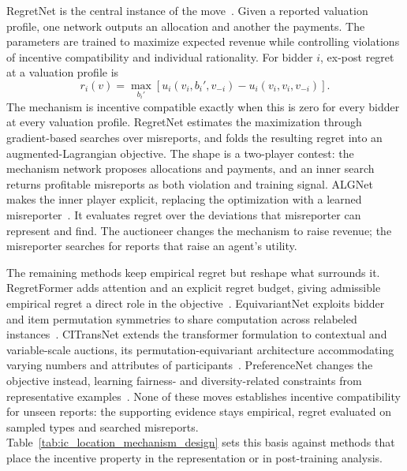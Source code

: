  RegretNet is the central instance of the
move~\citep{Duetting2019}. Given a reported valuation profile, one network outputs
an allocation and another the payments. The parameters are trained to maximize
expected revenue while controlling violations of incentive compatibility and
individual rationality. For bidder \(i\), ex-post regret at a valuation profile is
\[
r_i(v)
=
\max_{b_i'}
\left[
u_i(v_i,b_i',v_{-i})
-
u_i(v_i,v_i,v_{-i})
\right].
\]
The mechanism is incentive compatible exactly when this is zero for every bidder at
every valuation profile. RegretNet estimates the maximization through gradient-based
searches over misreports, and folds the resulting regret into an augmented-Lagrangian
objective. The shape is a two-player contest: the mechanism network proposes
allocations and payments, and an inner search returns profitable misreports as both
violation and training signal. ALGNet makes the inner player explicit, replacing the
optimization with a learned misreporter~\citep{Rahme2021Auction}. It evaluates regret
over the deviations that misreporter can represent and find. The auctioneer changes
the mechanism to raise revenue; the misreporter searches for reports that raise an
agent's utility.

 The remaining methods keep empirical
regret but reshape what surrounds it. RegretFormer adds attention and an explicit
regret budget, giving admissible empirical regret a direct role in the
objective~\citep{Ivanov2022}. EquivariantNet exploits bidder and item permutation
symmetries to share computation across relabeled
instances~\citep{Rahme2021Equivariant}. CITransNet extends the transformer
formulation to contextual and variable-scale auctions, its permutation-equivariant
architecture accommodating varying numbers and attributes of
participants~\citep{Duan2022}. PreferenceNet changes the objective instead, learning
fairness- and diversity-related constraints from representative
examples~\citep{Peri2021}. None of these moves establishes incentive compatibility
for unseen reports: the supporting evidence stays empirical, regret evaluated on
sampled types and searched misreports.
Table~\ref{tab:ic_location_mechanism_design} sets this basis against methods that
place the incentive property in the representation or in post-training analysis.

